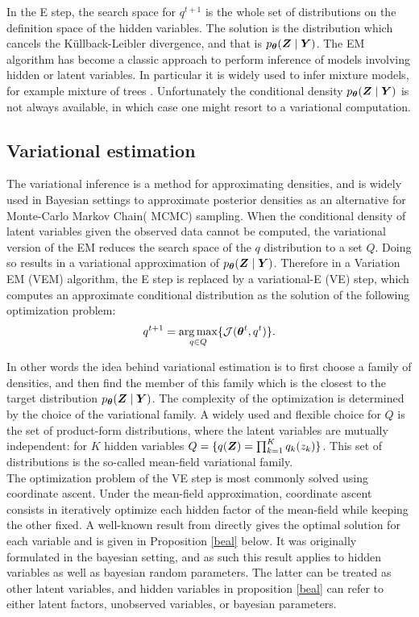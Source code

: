 In the E step, the search space for $q^{t+1}$ is the whole set of distributions on the definition space of the hidden variables. The solution is the distribution which cancels the Küllback-Leibler divergence, and that is $p_{\boldsymbol{\theta}}({\boldsymbol{Z}}\mid{\boldsymbol{Y}})$. The EM algorithm has become a classic approach to perform inference of models involving hidden or latent variables. In particular it is widely used to infer mixture models, for example mixture of trees \cite{MixtTrees}. Unfortunately the conditional density $p_{\boldsymbol{\theta}}({\boldsymbol{Z}}\mid{\boldsymbol{Y}})$ is not always available, in which case one might resort to a variational computation.
 

 \subsection{Variational estimation}
 The variational inference is a method for approximating densities\citep{JGZ99,WaJ08,BKM17}, and is widely used  in Bayesian settings to approximate posterior densities as an alternative for Monte-Carlo Markov Chain( MCMC) sampling. When the conditional density of latent variables given the observed data cannot be computed, the variational version of the EM reduces the search space of the $q$ distribution to a set $Q$. Doing so results in a variational approximation of $p_{\boldsymbol{\theta}}({\boldsymbol{Z}}\mid{\boldsymbol{Y}})$. Therefore in a  Variation EM (VEM) algorithm, the E step is replaced by a variational-E (VE) step, which computes an approximate conditional distribution as the solution of the following optimization problem:
 $$q^{t+1}=\operatorname*{arg\,max}_{q\in Q} \{ {\mathcal{J}}({\boldsymbol{\theta}}^t, q^t)\}.$$
 
 In other words the idea behind variational estimation is to first choose a family of densities, and then find the member of this family which is the closest to the target distribution $p_{\boldsymbol{\theta}}({\boldsymbol{Z}}\mid{\boldsymbol{Y}})$. The complexity of the optimization is determined by the choice of the variational family. A widely used and flexible choice for $Q$ is the set of product-form distributions, where the latent variables are mutually independent: for $K$ hidden variables $Q=\{q({\boldsymbol{Z}})=\prod_{k=1}^K q_k(z_k)\}$. This set of distributions is the so-called mean-field variational family. \\ 
 
The optimization problem of the VE step is most commonly solved using coordinate ascent. Under the  mean-field approximation, coordinate ascent consists in iteratively optimize each hidden factor of the mean-field while keeping the other fixed. A well-known result from \citet{beal} directly gives the optimal solution for each variable and is given in Proposition \ref{beal} below. It was originally formulated in the bayesian setting, and as such this result applies to hidden variables as well as bayesian random parameters. The latter can be treated as other latent variables, and  hidden variables in proposition \ref{beal} can refer to either latent factors, unobserved variables, or bayesian parameters.

